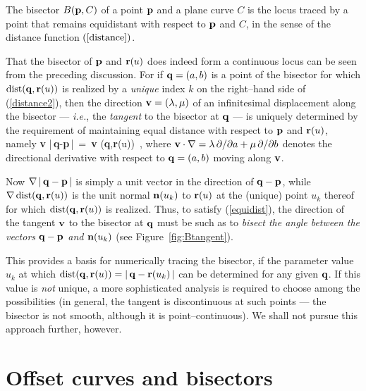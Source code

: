 \begin{dfn} \label{defbsctr}
The bisector $B({\bf p},C)$ of a point ${\bf p}$ and a plane curve $C$
is the locus traced by a point that remains equidistant with respect
to ${\bf p}$ and $C$, in the sense of the distance function $(\ref
{distance})$.
\end{dfn}

That the bisector of ${\bf p}$ and ${\bf r}(u)$ does indeed form
a continuous locus can be seen from the preceding discussion. For
if ${\bf q}=(a,b)$ is a point of the bisector for which ${\rm dist}
({\bf q},{\bf r}(u))$ is realized by a {\it unique\/} index $k$
on the right--hand side of (\ref{distance2}), then the direction
${\bf v}=(\lambda,\mu)$ of an infinitesimal displacement along the
bisector --- {\it i.e.}, the {\it tangent\/} to the bisector at ${\bf q}$
--- is uniquely determined by the requirement of maintaining equal
distance with respect to ${\bf p}$ and ${\bf r}(u)$, namely
\be \label{equidist}
{\bf v}\cdot\!\nabla \; |\,{\bf q}-{\bf p}\,| \,=\,
{\bf v}\cdot\!\nabla \; \dist({\bf q},{\bf r}(u)) \,,
\ee
where ${\bf v}\cdot\nabla=\lambda\,\partial/\partial a+\mu\,\partial
/\partial b$ denotes the directional derivative with respect to
${\bf q}=(a,b)$ moving along ${\bf v}$.


Now $\nabla\,|\,{\bf q}-{\bf p}\,|$ is simply a unit vector in the
direction of ${\bf q}-{\bf p}$, while $\nabla\,{\rm dist}({\bf q},{\bf r}
(u))$ is the unit normal ${\bf n}(u_k)$ to ${\bf r}(u)$ at the
(unique) point $u_k$ thereof for which ${\rm dist}({\bf q},{\bf r}(u))$
is realized. Thus, to satisfy (\ref{equidist}), the direction of
the tangent ${\bf v}$ to the bisector at ${\bf q}$ must be such as
to {\it bisect the angle between the vectors ${\bf q}-{\bf p}$ and
${\bf n}(u_k)$} (see Figure~\ref{fig:Btangent}).

This provides a basis for numerically tracing the bisector, if the
parameter value $u_k$ at which ${\rm dist}({\bf q},{\bf r}(u))=|\,{\bf q}
-{\bf r}(u_k)\,|$ can be determined for any given ${\bf q}$. If
this value is {\it not\/} unique, a more sophisticated analysis is
required to choose among the possibilities (in general, the tangent
is discontinuous at such points --- the bisector is not smooth,
although it is point--continuous). We shall not pursue this approach
further, however.

\section{Offset curves and bisectors}
\label{offsets}

